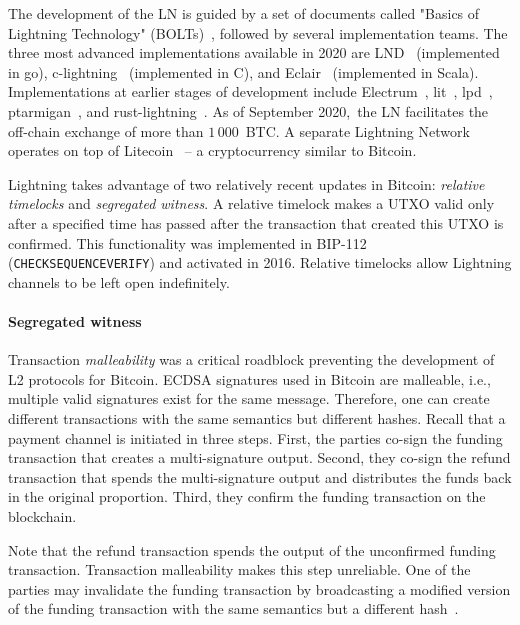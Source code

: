 The development of the LN is guided by a set of documents called "Basics of Lightning Technology" (BOLTs)~\cite{BOLT}, followed by several implementation teams.
The three most advanced implementations available in 2020 are LND~\cite{LND} (implemented in go), c-lightning~\cite{clightning} (implemented in C), and Eclair~\cite{Eclair} (implemented in Scala).
Implementations at earlier stages of development include Electrum~\cite{ElectrumWebsite, ElectrumLightningAnnounce}, lit~\cite{lit}, lpd~\cite{lpd}, ptarmigan~\cite{ptarmigan}, and rust-lightning~\cite{rustlightning}.
As of September 2020,~the LN facilitates the off-chain exchange of more than $1\,000$~BTC\@.
A separate Lightning Network operates on top of Litecoin~\cite{1MLLitecoin} -- a cryptocurrency similar to Bitcoin.

Lightning takes advantage of two relatively recent updates in Bitcoin: \textit{relative timelocks} and \textit{segregated witness}.
A relative timelock makes a UTXO valid only after a specified time has passed after the transaction that created this UTXO is confirmed.
This functionality was implemented in BIP-112~\cite{BtcDrak2015} (\texttt{CHECKSEQUENCEVERIFY}) and activated in 2016.
Relative timelocks allow Lightning channels to be left open indefinitely.


\paragraph{Segregated witness}

Transaction \textit{malleability} was a critical roadblock preventing the development of L2 protocols for Bitcoin.
ECDSA signatures used in Bitcoin are malleable, i.e., multiple valid signatures exist for the same message.
Therefore, one can create different transactions with the same semantics but different hashes.
Recall that a payment channel is initiated in three steps.
First, the parties co-sign the funding transaction that creates a multi-signature output.
Second, they co-sign the refund transaction that spends the multi-signature output and distributes the funds back in the original proportion.
Third, they confirm the funding transaction on the blockchain.

Note that the refund transaction spends the output of the unconfirmed funding transaction.
Transaction malleability makes this step unreliable.
One of the parties may invalidate the funding transaction by broadcasting a modified version of the funding transaction with the same semantics but a different hash~\cite{Harding2016}.


